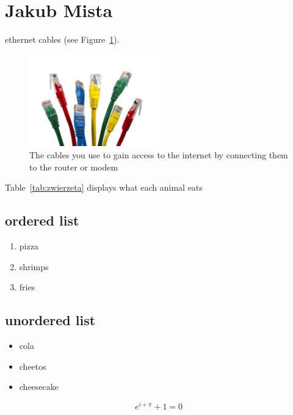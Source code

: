 \section{Jakub Mista}
\label{sec:jaks}

ethernet cables (see Figure~\ref{fig:cables}).

\begin{figure}[htbp] 
    \centering
    \includegraphics[width=0.5\textwidth]{pictures/cables.png} 
    \caption{The cables you use to gain access to the internet by connecting them to the router or modem}
    \label{fig:cables}
\end{figure}

Table~\ref{tab:zwierzeta} displays what each animal eats 



\subsection{ordered list}

\begin{enumerate}
    \item pizza
    \item shrimps
    \item fries
\end{enumerate}

\subsection{unordered list}

\begin{itemize}
    \item cola
    \item cheetos
    \item cheesecake
\end{itemize}

\[e^{i+\pi} + 1 = 0\]


